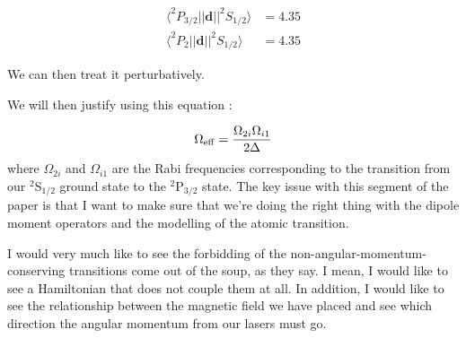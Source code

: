 \begin{align}
\langle ^2 P_{3/2}||\mathbf{d}||^2 S_{1/2} \rangle &= 4.35 \\
\langle ^2 P_{2}||\mathbf{d}||^2 S_{1/2} \rangle &= 4.35
\end{align}

We can then treat it perturbatively. 

We will then justify using this equation \cite{footAtomicPhysics} \cite{RamanBeamSplit}: 

\begin{equation}
\Omega_{\rm eff}=\frac{\Omega_{2i} \Omega_{i1}}{2 \Delta}
\end{equation}
where $\Omega_{2i}$ and $\Omega_{i1}$ are the Rabi frequencies corresponding to the transition from our $^2$S$_{1/2}$ ground state to the  $^2$P$_{3/2}$ state. 
The key issue with this segment of the paper is that I want to make sure that we're doing the right thing with the dipole moment operators and the modelling of the atomic transition.  %



 I would very much like to see the forbidding of the non-angular-momentum-conserving transitions come out of the soup, as they say. I mean, I would like to see a Hamiltonian that does not couple them at all. In addition, I would like to see the relationship between the magnetic field we have placed and see which direction the angular momentum from our lasers must go. 


